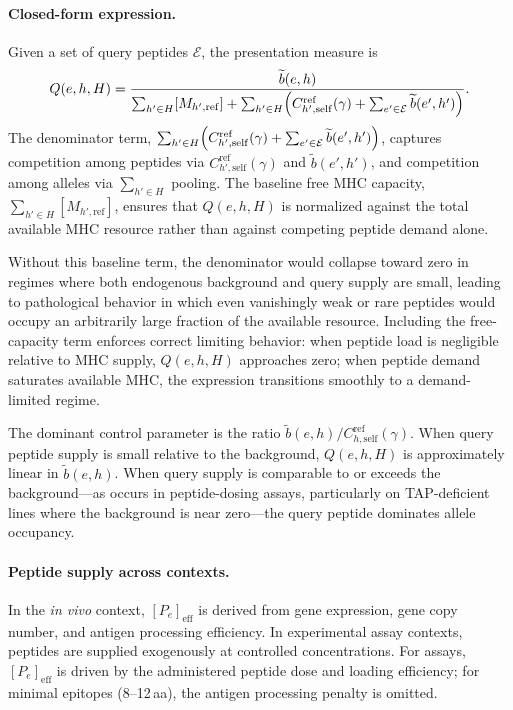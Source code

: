 \documentclass[11pt]{article}
\begin{document}
\paragraph{Closed-form expression.}
Given a set of query peptides \(\mathcal E\), the presentation measure is
\[
Q(e,h,H)
=
\frac{\widetilde b(e,h)}
     {\sum_{h'\in H}[M_{h',\mathrm{ref}}]
      +\sum_{h'\in H}\Bigl(C^{\mathrm{ref}}_{h',\mathrm{self}}(\gamma)
      +\sum_{e'\in\mathcal E}\widetilde b(e',h')\Bigr)}.
\]
The denominator term, \(\sum_{h'\in H}\Bigl(C^{\mathrm{ref}}_{h',\mathrm{self}}(\gamma) +\sum_{e'\in\mathcal E}\widetilde b(e',h')\Bigr)\), captures competition among peptides via \(C^{\mathrm{ref}}_{h',\mathrm{self}}(\gamma)\) and  \(\widetilde b(e',h')\), and competition among alleles via \(\sum_{h'\in H}\) pooling. The baseline free MHC capacity,
\(\sum_{h'\in H}[M_{h',\mathrm{ref}}]\), ensures that \(Q(e,h,H)\)
is normalized against the total available MHC resource rather than
against competing peptide demand alone.

Without this baseline term, the denominator would collapse toward zero
in regimes where both endogenous background and query supply are small,
leading to pathological behavior in which even vanishingly weak or rare
peptides would occupy an arbitrarily large fraction of the available
resource. Including the free-capacity term enforces correct limiting
behavior: when peptide load is negligible relative to MHC supply,
\(Q(e,h,H)\) approaches zero; when peptide demand saturates available
MHC, the expression transitions smoothly to a demand-limited regime. 

The dominant control parameter is the ratio \(\widetilde b(e,h)/C^{\mathrm{ref}}_{h,\mathrm{self}}(\gamma)\). When query peptide supply is small relative to the background, \(Q(e,h,H)\) is approximately linear in \(\widetilde b(e,h)\). When query supply is comparable to or exceeds the background---as occurs in peptide-dosing assays, particularly on TAP-deficient lines where the background is near zero---the query peptide dominates allele occupancy.

\paragraph{Peptide supply across contexts.}
In the \textit{in vivo} context, \([P_e]_{\mathrm{eff}}\) is derived from gene expression, gene copy number, and antigen processing efficiency. In experimental assay contexts, peptides are supplied exogenously at controlled concentrations. For assays, \([P_e]_{\mathrm{eff}}\) is driven by the administered peptide dose and loading efficiency; for minimal epitopes (8--12\,aa), the antigen processing penalty is omitted.
\end{document}
